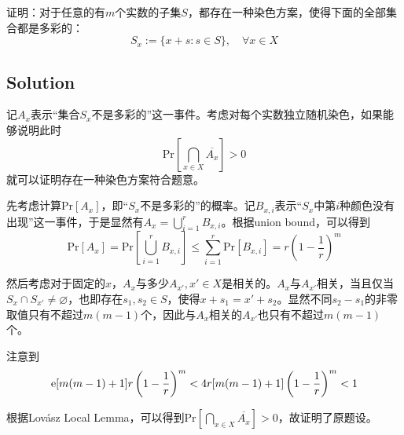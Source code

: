 \documentclass[UTF-8]{ctexart}
\begin{document}
证明：对于任意的有$m$个实数的子集$S$，都存在一种染色方案，使得下面的全部集合都是多彩的：
$$S_x := \{x + s: s \in S\}, \quad \forall x \in X$$
\subsection*{Solution}

记$A_x$表示“集合$S_x$不是多彩的”这一事件。考虑对每个实数独立随机染色，如果能够说明此时$$\text{Pr}\left[\bigcap_{x \in X}\overline{A_x}\right] > 0$$
就可以证明存在一种染色方案符合题意。

先考虑计算$\text{Pr}[A_x]$，即“$S_x$不是多彩的”的概率。记$B_{x, i}$表示“$S_x$中第$i$种颜色没有出现”这一事件，于是显然有$A_x = \bigcup\limits_{i = 1}^{r}B_{x, i}$。根据union bound，可以得到
\begin{equation}
\text{Pr}[A_x] = \text{Pr}\left[\bigcup_{i=1}^{r}B_{x, i}\right] \le \sum_{i=1}^{r}\text{Pr}[B_{x, i}] = r\left(1 - \frac 1r\right)^m
\end{equation}

然后考虑对于固定的$x$，$A_x$与多少$A_{x'}, x' \in X$是相关的。$A_x$与$A_{x'}$相关，当且仅当$S_x \cap S_{x'} \neq \varnothing$，也即存在$s_1, s_2 \in S$，使得$x + s_1 = x' + s_2$。显然不同$s_2 - s_1$的非零取值只有不超过$m(m-1)$个，因此与$A_x$相关的$A_{x'}$也只有不超过$m(m-1)$个。

注意到
\begin{equation}
\text e[m(m-1) + 1] r\left( 1 - \frac 1r\right)^m < 4r[m(m-1) + 1]\left(1-\frac1r\right)^m < 1
\label{t4_forward}
\end{equation}

根据Lov\'asz Local Lemma，可以得到$\text{Pr}\left[\bigcap_{x \in X}\overline{A_x}\right] > 0$，故证明了原题设。
\end{document}
